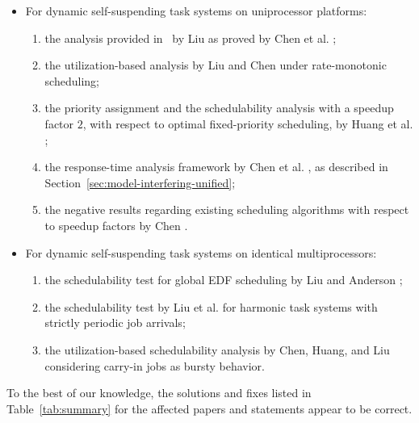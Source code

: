 \begin{itemize}
\item For dynamic self-suspending task systems on uniprocessor
  platforms:
  \begin{enumerate}
  \item the analysis provided in~\cite[Pages
    164-165]{Liu:2000:RS:518501} by Liu as proved by Chen et al. \cite{ChenHuangNelissen,ChenECRTS2016-suspension}; 
  \item the utilization-based analysis by Liu and Chen
    \cite{LiuChen:rtss2014} under rate-monotonic scheduling;
  \item the priority assignment and the schedulability analysis with a
    speedup factor $2$, with respect to optimal fixed-priority
    scheduling, by Huang et
    al. \cite{huangpass:dac2015};
  \item the response-time analysis framework by Chen et al. \cite{ChenECRTS2016-suspension}, as described in Section~\ref{sec:model-interfering-unified};
  \item the negative results regarding existing scheduling algorithms with respect to speedup factors by Chen \cite{RTSS2016-suspension}.
  \end{enumerate}
\item For dynamic self-suspending task systems on identical multiprocessors:
  \begin{enumerate}
  \item the schedulability test for global EDF scheduling by Liu and
    Anderson \cite{DBLP:conf/ecrts/LiuA13};
  \item the schedulability test by Liu et
    al. \cite{DBLP:conf/ecrts/LiuCH014} for harmonic task
    systems with strictly periodic job arrivals;
  \item the utilization-based schedulability analysis by Chen, Huang,
    and Liu \cite{ChenHLRTSS2015} considering carry-in jobs as
    bursty behavior.
  \end{enumerate}
\end{itemize}
To the best of our knowledge, 
the solutions and fixes listed in Table~\ref{tab:summary} for the
affected papers and statements appear to be correct.





